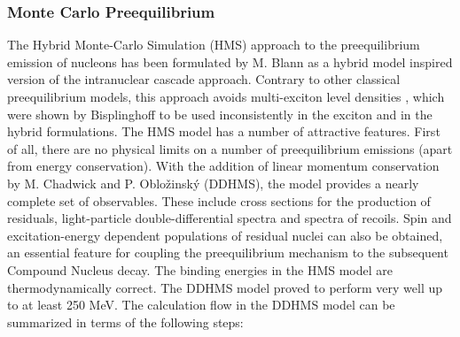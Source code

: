 
\subsubsection{Monte Carlo Preequilibrium\label{DDHMS}}

The Hybrid Monte-Carlo Simulation (HMS) approach to the preequilibrium
emission of nucleons has been formulated by M. Blann \cite{Blann-HMS} as a
hybrid model \cite{hybrid,hybrid1,hybrid2,hybrid3} inspired version of the
intranuclear cascade approach. Contrary to other classical preequilibrium
models, this approach avoids multi-exciton level densities%
, which were shown by Bisplinghoff \cite%
{Bisplinghoff} to be used inconsistently in the exciton and in the hybrid
formulations. The HMS%
 model has a number of attractive features. First of all, there
are no physical limits on a number of preequilibrium emissions (apart from
energy conservation). With the addition of linear momentum conservation by
M. Chadwick and P. Oblo\v zinsk\' y (DDHMS), the model provides a nearly
complete set of observables. These include cross sections for the production
of residuals, light-particle double-differential spectra and spectra of
recoils. Spin and excitation-energy dependent populations of residual nuclei
can also be obtained, an essential feature for coupling the preequilibrium
mechanism to the subsequent Compound Nucleus decay. The binding energies in
the HMS%
 model are thermodynamically correct. The DDHMS model proved to
perform very well
up to at least 250 MeV. %
The calculation flow in the DDHMS model can be summarized in terms of the
following steps:

